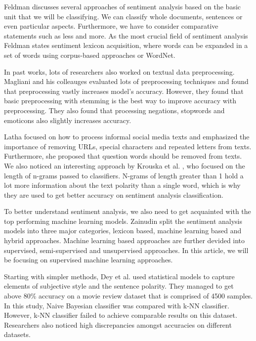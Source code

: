\documentclass[conference]{IEEEtran}
\begin{document}
Feldman \cite{feldman} discusses several approaches of sentiment analysis based on the basic unit that we will be classifying. We can classify whole documents, sentences or even particular aspects. Furthermore, we have to consider comparative statements such as less and more. As the most crucial field of sentiment analysis Feldman states sentiment lexicon acquisition, where words can be expanded in a set of words using corpus-based approaches or WordNet.

In past works, lots of researchers also worked on textual data preprocessing. Magliani and his colleauges \cite{magliani} evaluated lots of preprocessing techniques and found that preprocessing vastly increases model's accuracy. However, they found that basic preprocessing with stemming is the best way to improve accuracy with preprocessing. They also found that processing negations, stopwords and emoticons also slightly increases accuracy.

Latha \cite{latha} focused on how to process informal social media texts and emphasized the importance of removing URLs, special characters and repeated letters from texts. Furthermore, she proposed that question words should be removed from texts. We also noticed an interesting approach by Krouska et al. \cite{krouska}, who focused on the length of n-grams passed to classifiers. N-grams of length greater than 1 hold a lot more information about the text polarity than a single word, which is why they are used to get better accuracy on sentiment analysis classification.

To better understand sentiment analysis, we also need to get acquainted with the top performing machine learning models. Zainudin \cite{zainudin} split the sentiment analysis models into three major categories, lexicon based, machine learning based and hybrid approaches. Machine learning based approaches are further devided into supervised, semi-supervised and unsupervised approaches. In this article, we will be focusing on supervised machine learning approaches.

Starting with simpler methods, Dey \cite{naivebayes} et al. used statistical models to capture elements of subjective style and the sentence polarity. They managed to get above 80\% accuracy on a movie review dataset that is comprised of 4500 samples. In this study, Naive Bayesian classifier was compared with k-NN classifier. However, k-NN classifier failed to achieve comparable results on this dataset. Researchers also noticed high discrepancies amongst accuracies on different datasets.
\end{document}
